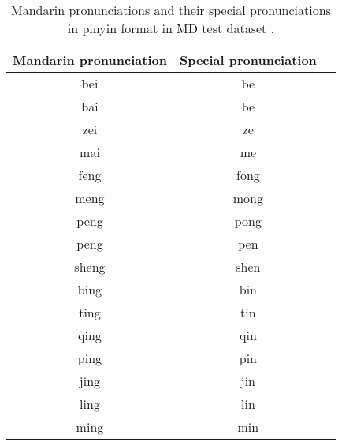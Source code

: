 \begin{table}[H]
\centering
\begin{tabular}{ccc}
\toprule
Mandarin pronunciation & Special pronunciation \\
\midrule
bei               &              be  \\
bai               &              be  \\
zei               &              ze  \\
mai               &              me  \\
feng              &              fong  \\
meng              &              mong  \\
peng              &              pong  \\
peng              &              pen  \\
sheng             &              shen \\
bing              &              bin  \\
ting              &              tin  \\
qing              &              qin  \\
ping              &              pin  \\
jing              &              jin  \\
ling              &              lin  \\
ming              &              min  \\
\bottomrule
\end{tabular}
\caption{Mandarin pronunciations and their special pronunciations in pinyin format in MD test dataset .}
\label{tab:app:special_pronun}
\end{table}

